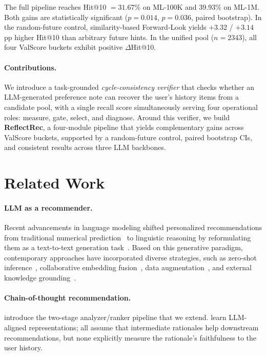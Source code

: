\documentclass[11pt]{article}
\begin{document}
The full pipeline reaches Hit@10 $=31.67\%$ on ML-100K and $39.93\%$ on ML-1M. Both gains are statistically significant ($p{=}0.014$, $p{=}0.036$, paired bootstrap). In the random-future control, similarity-based Forward-Look yields $+3.32$ / $+3.14$\,pp higher Hit@10 than arbitrary future hints. In the unified pool ($n{=}2343$), all four ValScore buckets exhibit positive $\Delta$Hit@10.

\paragraph{Contributions.}
We introduce a task-grounded \emph{cycle-consistency verifier} that checks whether an LLM-generated preference note can recover the user's history items from a candidate pool, with a single recall score simultaneously serving four operational roles: measure, gate, select, and diagnose. Around this verifier, we build \textbf{ReflectRec}, a four-module pipeline that yields complementary gains across ValScore buckets, supported by a random-future control, paired bootstrap CIs, and consistent results across three LLM backbones.

\section{Related Work\label{sec:related}}
\paragraph{LLM as a recommender.}
Recent advancements in language modeling shifted personalized recommendations from traditional numerical prediction~\citep{koren2009mf,rendle2009bpr} to linguistic reasoning by reformulating them as a text-to-text generation task~\citep{geng2022p5}. Based on this generative paradigm, contemporary approaches have incorporated diverse strategies, such as zero-shot inference~\citep{hou2023zeroshot}, collaborative embedding fusion~\citep{zhang2023collm,liao2024llara}, data augmentation~\citep{wang2024cold}, and external knowledge grounding~\citep{xi2024openworld}.

\paragraph{Chain-of-thought recommendation.}
\citet{cot4rec2025} introduce the two-stage analyzer/ranker pipeline that we extend. \citet{ren2024rla} learn LLM-aligned representations; all assume that intermediate rationales help downstream recommendations, but none explicitly measure the rationale’s faithfulness to the user history.
\end{document}
